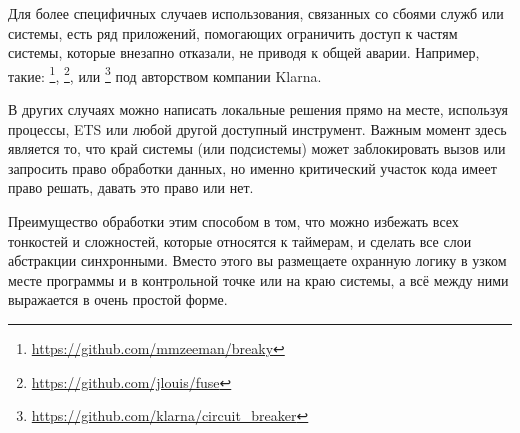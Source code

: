 \documentclass[11pt, oneside]{book}   	%
\begin{document}
Для более специфичных случаев использования, связанных со сбоями служб или системы, есть ряд приложений, помогающих ограничить доступ к частям системы, которые внезапно отказали, не приводя к общей аварии. Например, такие: \footnote{\href{https://github.com/mmzeeman/breaky}{https://github.com/mmzeeman/breaky}}, \footnote{\href{https://github.com/jlouis/fuse}{https://github.com/jlouis/fuse}},  или \footnote{\href{https://github.com/klarna/circuit\_breaker}{https://github.com/klarna/circuit\_breaker}} под авторством компании Klarna.

В других случаях можно написать локальные решения прямо на месте, используя процессы, ETS или любой другой доступный инструмент. Важным момент здесь является то, что край системы (или подсистемы) может заблокировать вызов или запросить право обработки данных, но именно критический участок кода имеет право решать, давать это право или нет.

Преимущество обработки этим способом в том, что можно избежать всех тонкостей и сложностей, которые относятся к таймерам, и сделать все слои абстракции синхронными. Вместо этого вы размещаете охранную логику в узком месте программы и в контрольной точке или на краю системы, а всё между ними выражается в очень простой форме.


\end{document}
